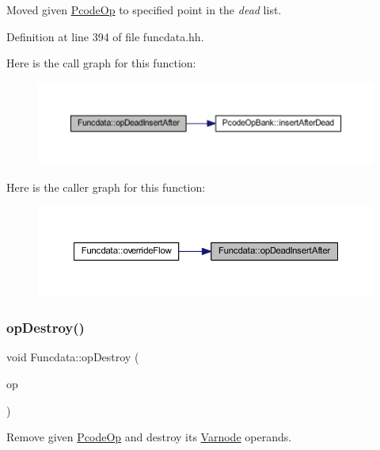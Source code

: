 Moved given \mbox{\hyperlink{class_pcode_op}{Pcode\+Op}} to specified point in the {\itshape dead} list. 



Definition at line 394 of file funcdata.\+hh.

Here is the call graph for this function\+:
\nopagebreak
\begin{figure}[H]
\begin{center}
\leavevmode
\includegraphics[width=350pt]{class_funcdata_a9cda5e2de1725ebf3fb885e375ea1a9d_cgraph}
\end{center}
\end{figure}
Here is the caller graph for this function\+:
\nopagebreak
\begin{figure}[H]
\begin{center}
\leavevmode
\includegraphics[width=350pt]{class_funcdata_a9cda5e2de1725ebf3fb885e375ea1a9d_icgraph}
\end{center}
\end{figure}
\mbox{\label{class_funcdata_a6976625d7b40efca0bc9941cb199ee44}} 
\subsubsection{\texorpdfstring{opDestroy()}{opDestroy()}}
{\footnotesize\ttfamily void Funcdata\+::op\+Destroy (\begin{DoxyParamCaption}\item[{\mbox{\hyperlink{class_pcode_op}{Pcode\+Op}} $\ast$}]{op }\end{DoxyParamCaption})}



Remove given \mbox{\hyperlink{class_pcode_op}{Pcode\+Op}} and destroy its \mbox{\hyperlink{class_varnode}{Varnode}} operands. 

